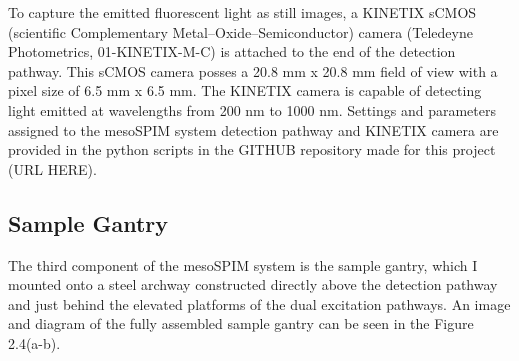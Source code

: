To capture the emitted fluorescent light as still images, a KINETIX sCMOS (scientific Complementary Metal–Oxide–Semiconductor) camera (Teledeyne Photometrics, 01-KINETIX-M-C) is attached to the end of the detection pathway. This sCMOS camera posses a 20.8 mm x 20.8 mm field of view with a pixel size of 6.5 mm x 6.5 mm. The KINETIX camera is capable of detecting light emitted at wavelengths from 200 nm to 1000 nm. Settings and parameters assigned to the mesoSPIM system detection pathway and KINETIX camera are provided in the python scripts in the GITHUB repository made for this project (URL HERE).



\subsection{Sample Gantry}
The third component of the mesoSPIM system is the sample gantry, which I mounted onto a steel archway constructed directly above the detection pathway and just behind the elevated platforms of the dual excitation pathways. An image and diagram of the fully assembled sample gantry can be seen in the Figure 2.4(a-b).

